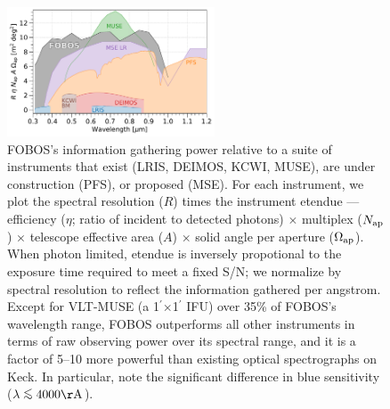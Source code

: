 \documentclass[oneside,11pt]{amsart}
\newcommand{\arcmin}{\mbox{$^{\prime}$}}
\DeclareRobustCommand{\lesssim}{%
\mathrel{\hskip-.5em\begin{array}{c}<\\[-8pt]\sim\end{array}\hskip-.5em}}
\begin{document}

\begin{figure}%
\includegraphics[width=0.55\textwidth]{figs/FOBOS_info_power.pdf}
\caption{FOBOS's information gathering power relative to a suite of instruments that exist (LRIS, DEIMOS, KCWI, MUSE), are under construction (PFS), or proposed (MSE). For each instrument, we plot the spectral resolution ($R$) times the instrument etendue --- efficiency ($\eta$; ratio of incident to detected photons) $\times$ multiplex ($N_{\rm ap}$) $\times$ telescope effective area ($A$) $\times$ solid angle per aperture ($\Omega_{\rm ap}$).  When photon limited, etendue is inversely propotional to the exposure time required to meet a fixed S/N; we normalize by spectral resolution to reflect the information gathered per angstrom.  Except for VLT-MUSE (a 1\arcmin{}$\times$1\arcmin{} IFU) over 35\% of FOBOS's wavelength range, FOBOS outperforms all other instruments in terms of raw observing power over its spectral range, and it is a factor of 5--10 more powerful than existing optical spectrographs on Keck.  In particular, note the significant difference in blue sensitivity ($\lambda \lesssim 4000 {\rm \AA}$).} 
\label{fig:info}    
\end{figure}
\end{document}

